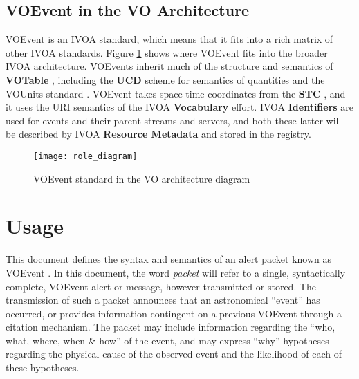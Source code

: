 \documentclass[11pt,a4paper]{ivoa}
\begin{document}
\subsection{VOEvent in the VO Architecture}

VOEvent is an IVOA standard, which means that it fits into a rich matrix of
other IVOA standards. Figure \ref{fig:diagram} shows where VOEvent fits into the broader
IVOA architecture. VOEvents inherit much of the structure and semantics of {\bf
VOTable} \citep{2019ivoa.spec.1021O}, including the {\bf UCD} 
\citep{2018ivoa.spec.0527P} scheme for semantics of quantities and the VOUnits
standard \citep{2014ivoa.spec.0523D}. VOEvent takes space-time coordinates from
the {\bf STC} \citep{2007ivoa.spec.1030R}, and it uses the URI semantics of the
IVOA {\bf Vocabulary} \citep{2009ivoa.spec.1007G} effort. IVOA {\bf Identifiers}
\citep{2016ivoa.spec.0523D} are used for events and their parent streams and
servers, and both these latter will be described by IVOA {\bf Resource Metadata}
\citep{2007ivoa.spec.0302H} and stored in the registry. 

\begin{figure}[ht!]
\centering\texttt{[image: role\_diagram]}
\caption{VOEvent standard in the VO architecture diagram}
\label{fig:diagram}
\end{figure}


\section{Usage}
\label{sec:2}
This document defines the syntax and semantics of an alert packet known as
VOEvent \citep{2011ivoa.spec.0711S}. In this document, the word \emph{packet}
will refer to a single, syntactically complete, VOEvent alert or message,
however transmitted or stored. The transmission of such a packet announces that
an astronomical ``event'' has occurred, or provides information contingent on a
previous VOEvent through a citation mechanism. The packet may include
information regarding the ``who, what, where, when \& how'' of the event, and
may express ``why'' hypotheses regarding the physical cause of the observed
event and the likelihood of each of these hypotheses.
\end{document}
